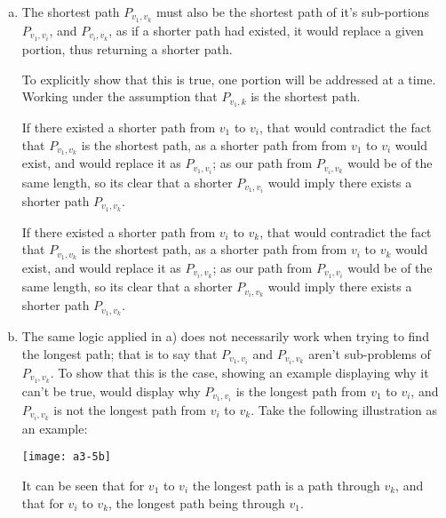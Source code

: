 \documentclass[10pt]{article}
\begin{document}
\begin{question}
    \begin{enumerate}[a)]
        \item %
           The shortest path $P_{v_1,v_k}$ must also be the shortest path of it's sub-portions $P_{v_1, v_i}$, and $P_{v_i, v_k}$, as if a shorter path had existed, it would replace a given portion, thus returning a shorter path.
           
           To explicitly show that this is true, one portion will be addressed at a time. Working under the assumption that $P_{v_1,k}$ is the shortest path.
           
           
           If there existed a shorter path from $v_1$ to $v_i$, that would contradict the fact that $P_{v_1,v_k}$ is the shortest path, as a shorter path from from $v_1$ to $v_i$ would exist, and would replace it as $P_{v_1, v_i}$; as our path from $P_{v_i, v_k}$ would be of the same length, so its clear that a shorter $P_{v_1, v_i}$ would imply there exists a shorter path $P_{v_1,v_k}$.
           
           
           If there existed a shorter path from $v_i$ to $v_k$, that would contradict the fact that $P_{v_1,v_k}$ is the shortest path, as a shorter path from from $v_i$ to $v_k$ would exist, and would replace it as $P_{v_i, v_k}$; as our path from $P_{v_1, v_i}$ would be of the same length, so its clear that a shorter $P_{v_i, v_k}$ would imply there exists a shorter path $P_{v_1,v_k}$.
        \item %
            The same logic applied in a) does not necessarily work when trying to find the longest path; that is to say that $P_{v_1, v_i}$ and $P_{v_i, v_k}$ aren't sub-problems of $P_{v_1,v_k}$. To show that this is the case, showing an example displaying why it can't be true, would display why $P_{v_1,v_i}$ is  the longest path from $v_1$ to $v_i$, and $P_{v_i,v_k}$ is not the longest path from $v_i$ to $v_k$.
            Take the following illustration as an example: \newline \newline
            \begin{center}
                \texttt{[image: a3-5b]}
            \end{center}
            \newline
            It can be seen that for $v_1$ to $v_i$ the longest path is a path through $v_k$, and that for $v_i$ to $v_k$, the longest path being through $v_1$.
    \end{enumerate}
\end{question} 
\end{document}
